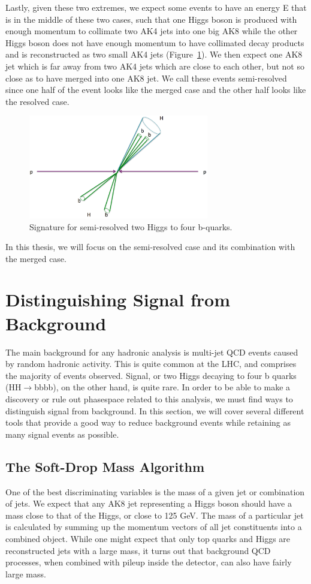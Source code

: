 Lastly, given these two extremes, we expect some events to have an energy E that is in the middle of these two cases, such that one Higgs boson is produced with enough momentum to collimate two AK4 jets into one big AK8 while the other Higgs boson does not have enough momentum to have collimated decay products and is reconstructed as two small AK4 jets (Figure~\ref{Fig:threecases3}). We then expect one AK8 jet which is far away from two AK4 jets which are close to each other, but not so close as to have merged into one AK8 jet. We call these events semi-resolved since one half of the event looks like the merged case and the other half looks like the resolved case. 
\begin{figure}[h!]
    \centering
        \includegraphics[width=0.7\textwidth]{F4/semiresolved.png}
        \caption{Signature for semi-resolved two Higgs to four b-quarks.}
        \label{Fig:threecases3}
\end{figure}
In this thesis, we will focus on the semi-resolved case and its combination with the merged case.
\vspace{5mm}

\section{Distinguishing Signal from Background}
The main background for any hadronic analysis is multi-jet QCD events caused by random hadronic activity. This is quite common at the LHC, and comprises the majority of events observed. Signal, or two Higgs decaying to four b quarks (HH$\rightarrow$bbbb), on the other hand, is quite rare. In order to be able to make a discovery or rule out phasespace related to this analysis, we must find ways to distinguish signal from background. In this section, we will cover several different tools that provide a good way to reduce background events while retaining as many signal events as possible.


\subsection{The Soft-Drop Mass Algorithm}
One of the best discriminating variables is the mass of a given jet or combination of jets. We expect that any AK8 jet representing a Higgs boson should have a mass close to that of the Higgs, or close to 125 GeV. The mass of a particular jet is calculated by summing up the momentum vectors of all jet constituents into a combined object. While one might expect that only top quarks and Higgs are reconstructed jets with a large mass, it turns out that background QCD processes, when combined with pileup inside the detector, can also have fairly large mass. 

